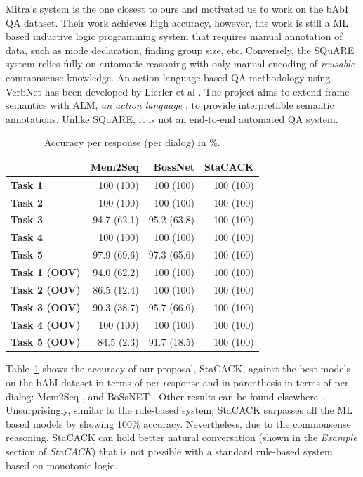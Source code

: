 \documentclass[letterpaper]{article}
\begin{document}
Mitra's system is the one closest to ours and motivated us to work on
the bAbI QA dataset. Their work achieves high accuracy, however, the
work is still a ML based inductive logic programming system that
requires manual annotation of data, such as mode declaration, finding
group size, etc. Conversely, the SQuARE system relies fully on
automatic reasoning with only manual encoding of \textit{reusable}
commonsense knowledge. An action language based QA methodology using
VerbNet has been developed by Lierler et al \cite{ALM}. The project
aims to extend frame semantics with ALM, \textit{an action language}
\cite{ALM}, to provide interpretable semantic annotations. Unlike
SQuARE, it is not an end-to-end automated QA system.

\begin{table}
\centering
\scriptsize
\setlength{\tabcolsep}{0.72em}
\begin{tabular}{|l|*{3}{r|}}
\hline
&  \textbf{Mem2Seq}
& \textbf{BossNet}
& \textbf{StaCACK}
\\[.82em]
\hline\hline
\textbf{Task 1}  & 100 (100) & 100 (100)  & 100 (100) \\\hline
\textbf{Task 2}  & 100 (100) & 100 (100)  & 100 (100) \\\hline
\textbf{Task 3}  & 94.7 (62.1) & 95.2 (63.8)  & 100 (100) \\\hline
\textbf{Task 4}  & 100 (100) & 100 (100)  & 100 (100) \\\hline
\textbf{Task 5}  & 97.9 (69.6) & 97.3 (65.6)  & 100 (100) \\\hline
\textbf{Task 1 (OOV)} & 94.0 (62.2) & 100 (100)   & 100 (100)\\\hline
\textbf{Task 2 (OOV)} & 86.5 (12.4)  & 100 (100) & 100 (100) \\\hline
\textbf{Task 3 (OOV)} & 90.3 (38.7) & 95.7 (66.6)  & 100 (100) \\\hline
\textbf{Task 4 (OOV)} & 100 (100) & 100 (100) & 100 (100) \\\hline
\textbf{Task 5 (OOV)} & 84.5 (2.3) & 91.7 (18.5)  & 100 (100) \\\hline

\end{tabular}

\caption{Accuracy per response (per dialog) in \%.}
\label{table:Stacack_compare}
\end{table}


Table~\ref{table:Stacack_compare} shows the accuracy of our proposal,
StaCACK, against the best models on the bAbI dataset in terms of
per-response and in parenthesis in terms of per-dialog: Mem2Seq
\cite{mem2seq}, and BoSsNET \cite{bossnet}. Other results can be found
elsewhere~\cite{babi_dialog}.
Unsurprisingly, similar to the rule-based system, StaCACK surpasses
all the ML based models by showing 100\% accuracy. Nevertheless, due
to the commonsense reasoning, StaCACK can hold better natural
conversation (shown in the \textit{Example} section of
\textit{StaCACK}) that is not possible with a standard rule-based
system based on monotonic logic.
\end{document}
